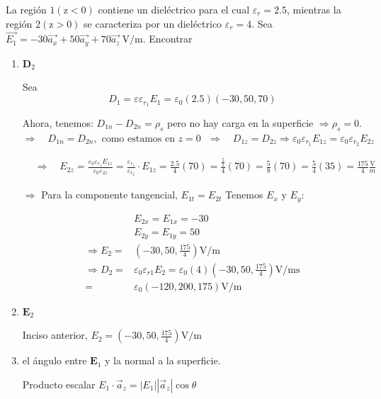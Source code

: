 




\begin{problema}

    La región $1(\mathrm{z}<0)$ contiene un dieléctrico para el cual $\varepsilon_{r}=2.5$, mientras la región $2(\mathrm{z}>0)$ se caracteriza por un dieléctrico $\varepsilon_{r}=4$. Sea $\overrightarrow{E_{1}}=-30 \overrightarrow{a_{x}}+50 \overrightarrow{a_{y}}+70 \overrightarrow{a_{z}} \mathrm{~V} / \mathrm{m}$. Encontrar 
    \begin{enumerate}
        \item $\mathbf{D}_{2}$
        \begin{sol}
      Sea       
$$ D_{1}=\varepsilon\varepsilon_{r_1} E_{1}=\varepsilon_{0}(2.5)(-30,50,70)
$$

Ahora, tenemos: $D_{1n}-D_{2n}=\rho_{s}$ pero no hay carga en la superficie $\Rightarrow \rho_{s}=0$. $\Rightarrow \quad D_{1 n}=D_{2 n}, \text { como estamos en $z=0$ } \Rightarrow \quad D_{1 z}=D_{2 z} \Rightarrow \varepsilon_{0} \varepsilon_{r_{1}} E_{1 z}=\varepsilon_{0} \varepsilon_{r_{2}} E_{2 z}$

$$
\begin{aligned}
& \Rightarrow \quad E_{2 z}=\frac{\varepsilon_{0} \varepsilon_{r_{1}} E_{1 z}}{\varepsilon_{0} \varepsilon_{2 z}}=\frac{\varepsilon_{r_1}}{\varepsilon_{r_{2}}} \cdot E_{1 z}=\frac{2. 5}{4}(70)=\frac{\frac{5}{2}}{4}(70)  =\frac{5}{8}(70)=\frac{5}{4}(35)=\frac{175}{4} \frac{\mathrm{V}}{m}
\end{aligned}
$$

$\Rightarrow$ Para la componente tangencial, $E_{1 t}=E_{2 t}$ Tenemos $E_x$ y $E_y$:

$$
\begin{aligned}
& E_{2 x}=E_{1 x}=-30 \\
& E_{2 y}=E_{1 y}=50 \\
\Rightarrow E_{2}= & \left(-30,50, \frac{175}{4}\right) \mathrm{V} / \mathrm{m} \\
\Rightarrow D_{2}= & \varepsilon_{0} \varepsilon_{r 1} E_{2}=\varepsilon_{0}(4)\left(-30,50, \frac{175}{4}\right) \mathrm{V} / \mathrm{ms} \\
= & \varepsilon_{0}(-120,200,175) \mathrm{V} / \mathrm{m}
\end{aligned}
$$
        \end{sol}
        \item $\mathbf{E}_{2}$ 
        \begin{sol} Inciso anterior, $E_{2}=\left(-30,50, \frac{175}{4}\right) \mathrm{V} / \mathrm{m}$
        \end{sol}
        \item el ángulo entre $\mathbf{E}_{1}$ y la normal a la superficie.
        \begin{sol}
            Producto escalar $E_{1} \cdot \vec{a}_{z}=\left|E_{1}\right|\left|\vec{a}_{z}\right| \cos \theta$


\end{sol}
\end{enumerate}
\end{problema}
